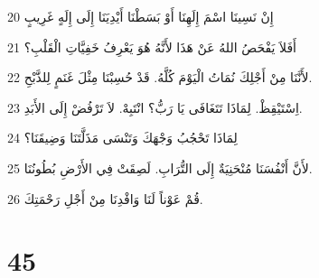 \par 20 إِنْ نَسِينَا اسْمَ إِلَهِنَا أَوْ بَسَطْنَا أَيْدِيَنَا إِلَى إِلَهٍ غَرِيبٍ
\par 21 أَفَلاَ يَفْحَصُ اللهُ عَنْ هَذَا لأَنَّهُ هُوَ يَعْرِفُ خَفِيَّاتِ الْقَلْبِ؟
\par 22 لأَنَّنَا مِنْ أَجْلِكَ نُمَاتُ الْيَوْمَ كُلَّهُ. قَدْ حُسِبْنَا مِثْلَ غَنَمٍ لِلذَّبْحِ.
\par 23 اِسْتَيْقِظْ. لِمَاذَا تَتَغَافَى يَا رَبُّ؟ انْتَبِهْ. لاَ تَرْفُضْ إِلَى الأَبَدِ.
\par 24 لِمَاذَا تَحْجُبُ وَجْهَكَ وَتَنْسَى مَذَلَّتَنَا وَضِيقَنَا؟
\par 25 لأَنَّ أَنْفُسَنَا مُنْحَنِيَةٌ إِلَى التُّرَابِ. لَصِقَتْ فِي الأَرْضِ بُطُونُنَا.
\par 26 قُمْ عَوْناً لَنَا وَافْدِنَا مِنْ أَجْلِ رَحْمَتِكَ.

\chapter{45}

